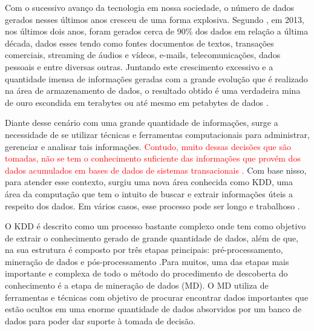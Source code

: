 
\par
Com o sucessivo avanço da tecnologia em nossa sociedade, o número de dados gerados nesses últimos anos cresceu de uma forma explosiva. Segundo , em 2013, nos últimos dois anos, foram gerados cerca de 90\% dos dados em relação a última década, dados esses tendo como fontes documentos de textos, transações comerciais, streaming de áudios e vídeos, e-mails, telecomunicações, dados pessoais e entre diversas outras. Juntando este crescimento excessivo e a quantidade imensa de informações geradas com a grande evolução que é realizado na área de armazenamento de dados, o resultado obtido é uma verdadeira mina de ouro escondida em terabytes ou até mesmo em petabytes de dados \cite{Carvalho2014}. 

\par
Diante desse cenário com uma grande quantidade de informações, surge a necessidade de se utilizar técnicas e ferramentas computacionais para administrar, gerenciar e analisar tais informações. \textcolor{red}{Contudo, muito dessas decisões que são tomadas, não se tem o conhecimento suficiente das informações que provém dos dados acumulados em bases de dados de sistemas transacionais \cite{Rabelo2007}.} Com base nisso, para atender esse contexto, surgiu uma nova área conhecida como KDD, uma área da computação que tem o intuito de buscar e extrair informações úteis a respeito dos dados. Em vários casos, esse processo pode ser longo e trabalhoso \cite{Stulp2014}.

\par
 O KDD é descrito como um processo bastante complexo onde tem como objetivo de extrair o conhecimento gerado de grande quantidade de dados, além de que, na sua estrutura é composto por três etapas principais: pré-processamento, mineração de dados e pós-processamento \cite{Rabelo2007}.Para muitos, uma das etapas mais importante e complexa de todo o método do procedimento de descoberta do conhecimento é a etapa de mineração de dados (MD). O MD utiliza de ferramentas e técnicas com objetivo de procurar encontrar dados importantes que estão ocultos em uma enorme quantidade de dados absorvidos por um banco de dados para poder dar suporte à tomada de decisão.

